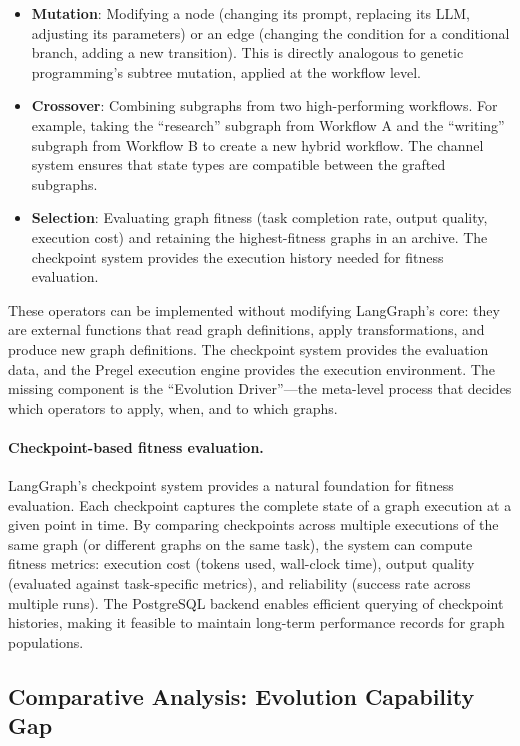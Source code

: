 \begin{itemize}
    \item \textbf{Mutation}: Modifying a node (changing its prompt, replacing its LLM, adjusting its parameters) or an edge (changing the condition for a conditional branch, adding a new transition). This is directly analogous to genetic programming's subtree mutation, applied at the workflow level.
    \item \textbf{Crossover}: Combining subgraphs from two high-performing workflows. For example, taking the ``research'' subgraph from Workflow A and the ``writing'' subgraph from Workflow B to create a new hybrid workflow. The channel system ensures that state types are compatible between the grafted subgraphs.
    \item \textbf{Selection}: Evaluating graph fitness (task completion rate, output quality, execution cost) and retaining the highest-fitness graphs in an archive. The checkpoint system provides the execution history needed for fitness evaluation.
\end{itemize}

These operators can be implemented without modifying LangGraph's core: they are external functions that read graph definitions, apply transformations, and produce new graph definitions. The checkpoint system provides the evaluation data, and the Pregel execution engine provides the execution environment. The missing component is the ``Evolution Driver''---the meta-level process that decides which operators to apply, when, and to which graphs.

\paragraph{Checkpoint-based fitness evaluation.}
LangGraph's checkpoint system provides a natural foundation for fitness evaluation. Each checkpoint captures the complete state of a graph execution at a given point in time. By comparing checkpoints across multiple executions of the same graph (or different graphs on the same task), the system can compute fitness metrics: execution cost (tokens used, wall-clock time), output quality (evaluated against task-specific metrics), and reliability (success rate across multiple runs). The PostgreSQL backend enables efficient querying of checkpoint histories, making it feasible to maintain long-term performance records for graph populations.


\subsection{Comparative Analysis: Evolution Capability Gap}

